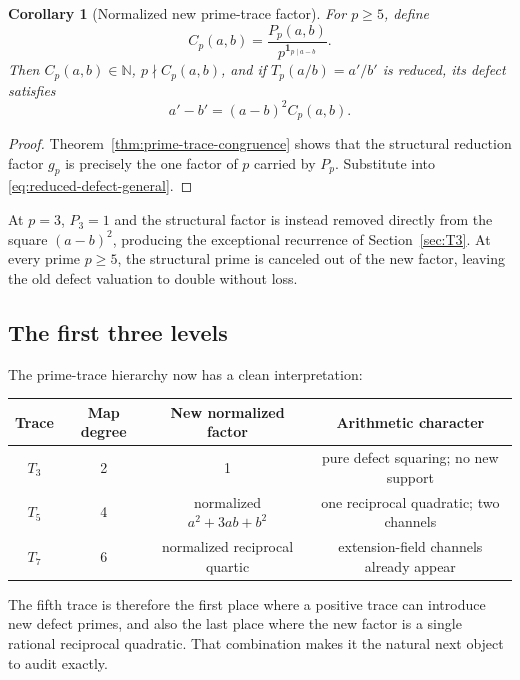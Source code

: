 \documentclass[11pt,oneside]{article}
\newtheorem{corollary}[theorem]{Corollary}
\theoremstyle{definition}
\theoremstyle{remark}
\newcommand{\N}{\mathbb N}
\begin{document}
\begin{corollary}[Normalized new prime-trace factor]
\label{cor:normalized-prime-factor}
For \(p\ge5\), define
\begin{equation}
 C_p(a,b)=\frac{P_p(a,b)}{p^{\mathbf1_{p\mid a-b}}}.
 \label{eq:Cp}
\end{equation}
Then \(C_p(a,b)\in\N\), \(p\nmid C_p(a,b)\), and if
\(T_p(a/b)=a'/b'\) is reduced, its defect satisfies
\begin{equation}
 a'-b'=(a-b)^2C_p(a,b).
 \label{eq:prime-reduced-defect}
\end{equation}
\end{corollary}

\begin{proof}
Theorem~\ref{thm:prime-trace-congruence} shows that the structural reduction factor
\(g_p\) is precisely the one factor of \(p\) carried by \(P_p\).  Substitute into
\eqref{eq:reduced-defect-general}.
\end{proof}

At \(p=3\), \(P_3=1\) and the structural factor is instead removed directly from the square
\((a-b)^2\), producing the exceptional recurrence of Section~\ref{sec:T3}.  At every prime
\(p\ge5\), the structural prime is canceled out of the new factor, leaving the old defect
valuation to double without loss.

\subsection{The first three levels}

The prime-trace hierarchy now has a clean interpretation:
\begin{center}
\small
\begin{tabular}{@{}c c c c@{}}
\toprule
Trace & Map degree & New normalized factor & Arithmetic character\\
\midrule
\(T_3\)&2&1&pure defect squaring; no new support\\
\(T_5\)&4&normalized \(a^2+3ab+b^2\)&one reciprocal quadratic; two channels\\
\(T_7\)&6&normalized reciprocal quartic&extension-field channels already appear\\
\bottomrule
\end{tabular}
\end{center}

The fifth trace is therefore the first place where a positive trace can introduce new defect
primes, and also the last place where the new factor is a single rational reciprocal
quadratic.  That combination makes it the natural next object to audit exactly.
\end{document}
